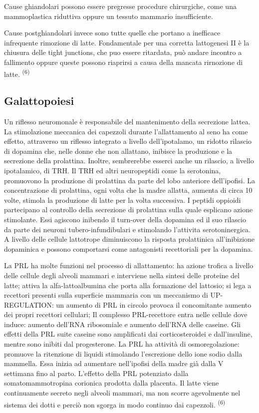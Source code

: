 \documentclass[]{article}
\begin{document}
Cause ghiandolari possono essere pregresse procedure chirurgiche, come
una mammoplastica riduttiva oppure un tessuto mammario insufficiente.

Cause postghiandolari invece sono tutte quelle che portano a inefficace
infrequente rimozione di latte. Fondamentale per una corretta
lattogenesi II è la chiusura delle tight junctions, che puo essere
ritardata, può andare incontro a fallimento oppure queste possono
riaprirsi a causa della mancata rirnozione di latte.
\textsuperscript{(6) }

\hypertarget{galattopoiesi}{%
\subsection{Galattopoiesi}\label{galattopoiesi}}

Un riflesso neuromonale è responsabile del mantenimento della secrezione
lattea. La stimolazione meccanica dei capezzoli durante l'allattamento
al seno ha come effetto, attraverso un riflesso integrato a livello
dell'ipotalamo, un ridotto rilascio di dopamina che, nelle donne che non
allattano, inibisce la produzione e la secrezione della prolattina.
Inoltre, sembrerebbe esserci anche un rilascio, a livello ipotalamico,
di TRH. Il TRH ed altri neuropeptidi come la serotonina, promuovono la
produzione di prolattina da parte del lobo anteriore dell'ipofisi. La
concentrazione di prolattina, ogni volta che la madre allatta, aumenta
di circa 10 volte, stimola la produzione di latte per la volta
successiva. I peptidi oppioidi partecipano al controllo della secrezione
di prolattina sulla quale esplicano azione stimolante. Essi agiscono
inibendo il turn-over della dopamina ed il suo rilascio da parte dei
neuroni tubero-infundibulari e stimolando l'attivita serotoninergica. A
livello delle cellule lattotrope diminuiscono la risposta prolattinica
all'inibizione dopaminica e possono comportarsi come antagonisti
recettoriali per la dopamina.

La PRL ha molte funzioni nel processo di allattamento: ha azione trofica
a livello delle cellule degli alveoli mammari e interviene nella sintesi
delle proteine del latte; attiva la alfa-lattoalbumina che porta alla
formazione del lattosio; si lega a recettori presenti sulla superficie
mammaria con un meccanismo di UP-REGULATION: un aumento di PRL in
circolo provoca il concomitante aumento dei propri recettori cellulari;
Il complesso PRL-recettore entra nelle cellule dove induce: aumento
dell'RNA ribosomiale e aumento dell'RNA delle caseine. Gli effetti della
PRL suite caseine sono amplificati dai corticosteroidei e dall'insuline,
mentre sono inibiti dal progesterone. La PRL ha attività di
osmoregolazione: promuove la ritenzione di liquidi stimolando
l'escrezione dello ione sodio dalla mammella. Essa inizia ad aumentare
nell'ipofisi della madre già dalla V settimana fino al parto. L'effetto
della PRL potenziato dalla somatomammotropina corionica prodotta dalla
placenta. Il latte viene continuamente secreto negli alveoli mammari, ma
non scorre agevolmente nel sistema dei dotti e perciò non sgorga in modo
continuo dai capezzoli. \textsuperscript{(6) }
\end{document}
